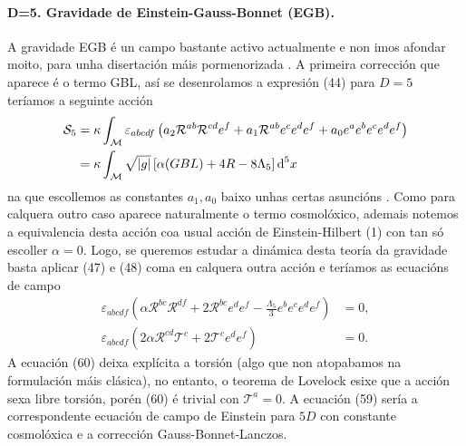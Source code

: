 \paragraph{D=5. Gravidade de Einstein-Gauss-Bonnet (EGB).}
A gravidade EGB é un campo bastante activo actualmente e non imos afondar moito, para unha disertación máis pormenorizada \cite{Gauss_Bonnet_2022}. A primeira corrección que aparece é o termo GBL, así se desenrolamos a expresión (44) para $D=5$ teríamos a seguinte acción
\begin{align}
    \mathcal{S}_5 &= \kappa\int_\mathcal{M}\varepsilon_{abcdf}\left(
    a_2\mathcal{R}^{ab}\mathcal{R}^{cd}e^f + a_1\mathcal{R}^{ab}e^ce^d e^f + a_0e^ae^be^ce^de^f
    \right)\\
    &=\kappa\int_\mathcal{M}\sqrt{|g|}\left[
    \alpha (GBL) + 4R - 8\Lambda_{5}
    \right]\text{d}^5x 
\end{align}
na que escollemos as constantes $a_1,a_0$ baixo unhas certas asuncións \cite{Gauss_Bonnet_2022}. Como para calquera outro caso aparece naturalmente o termo cosmolóxico, ademais notemos a equivalencia desta acción coa usual acción de Einstein-Hilbert (1) con tan só escoller $\alpha=0$. Logo, se queremos estudar a dinámica desta teoría da gravidade basta aplicar (47) e (48) coma en calquera outra acción e teríamos as ecuacións de campo
\begin{align}
    \varepsilon_{abcdf}\left(
    \alpha\mathcal{R}^{bc}\mathcal{R}^{df} + 2\mathcal{R}^{bc}e^d e^f - \frac{\Lambda_5}{3}e^be^ce^de^f
    \right) & = 0,\\
    \varepsilon_{abcdf}\left(
    2\alpha\mathcal{R}^{cd}\mathcal{T}^c + 2\mathcal{T}^c e^de^f
    \right) & = 0.
\end{align}
A ecuación (60) deixa explícita a torsión (algo que non atopabamos na formulación máis clásica), no entanto, o teorema de Lovelock esixe que a acción sexa libre torsión, porén (60) é trivial con $\mathcal{T}^a=0$. A ecuación (59) sería a correspondente ecuación de campo de Einstein para $5D$ con constante cosmolóxica e a corrección Gauss-Bonnet-Lanczos.

